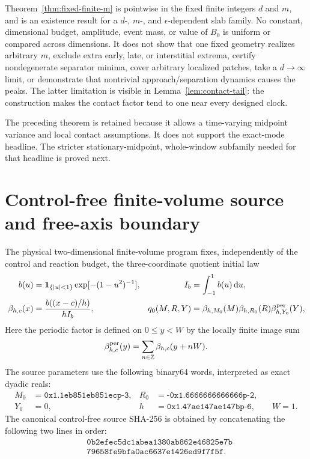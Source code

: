 \documentclass[aps,physrev,onecolumn,amsmath,amssymb,longbibliography]{revtex4-2}
\newcommand{\dd}{\mathrm d}
\begin{document}
Theorem~\ref{thm:fixed-finite-m} is pointwise in the fixed finite integers
\(d\) and \(m\), and is an existence result for a \(d\)-, \(m\)-, and
\(\epsilon\)-dependent slab family.  No constant, dimensional budget,
amplitude, event mass, or value of \(B_0\) is uniform or compared across
dimensions.  It does not show that
one fixed geometry realizes arbitrary \(m\), exclude extra early, late, or
interstitial extrema, certify nondegenerate separator minima, cover arbitrary
localized patches, take a \(d\to\infty\) limit, or demonstrate
that nontrivial approach/separation dynamics causes the peaks.  The latter
limitation is visible in Lemma~\ref{lem:contact-tail}: the construction makes
the contact factor tend to one near every designed clock.

The preceding theorem is retained because it allows a time-varying midpoint
variance and local contact assumptions.  It does not support the exact-mode
headline.  The stricter stationary-midpoint, whole-window subfamily needed for
that headline is proved next.



\section{Control-free finite-volume source and free-axis boundary}
\label{sec:initial-source-boundary}

The physical two-dimensional finite-volume program fixes, independently of
the control and reaction budget, the three-coordinate quotient initial law
\begin{align}
 b(u)&=\mathbf1_{\{|u|<1\}}\exp[-(1-u^2)^{-1}],
 &I_b&=\int_{-1}^{1}b(u)\,\dd u,\nonumber\\
 \beta_{h,c}(x)&=\frac{b((x-c)/h)}{hI_b},
 &q_0(M,R,Y)&=\beta_{h,M_0}(M)\beta_{h,R_0}(R)
                    \beta^{\rm per}_{h,Y_0}(Y),
 \label{eq:physical-compact-bump-initial}
\end{align}
Here the periodic factor is defined on $0\le y<W$ by the locally finite image
sum
\begin{equation}
 \beta^{\rm per}_{h,c}(y)=\sum_{n\in\mathbb Z}\beta_{h,c}(y+nW).
 \label{eq:periodic-compact-bump}
\end{equation}
The source parameters use the following binary64 words, interpreted as exact
dyadic reals:
\begin{align}
 M_0&=\texttt{0x1.1eb851eb851ecp-3},
 &R_0&=\texttt{-0x1.6666666666666p-2},\nonumber\\
 Y_0&=0,
 &h&=\texttt{0x1.47ae147ae147bp-6},\qquad W=1.
 \label{eq:physical-compact-bump-parameters}
\end{align}
The canonical control-free source SHA-256 is obtained by concatenating the
following two lines in order:
\begin{align}
 &\texttt{0b2efec5dc1abea1380ab862e46825e7b}\nonumber\\[-0.25ex]
 &\texttt{79658fe9bfa0ac6637e1426ed9f7f5f}.
 \label{eq:physical-initial-source-sha}
\end{align}
\end{document}
